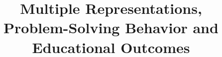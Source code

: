 \documentclass{edm_template}
\begin{document}
\title{Multiple Representations, Problem-Solving Behavior and Educational Outcomes}
%
%
%
%
%
\end{document}
